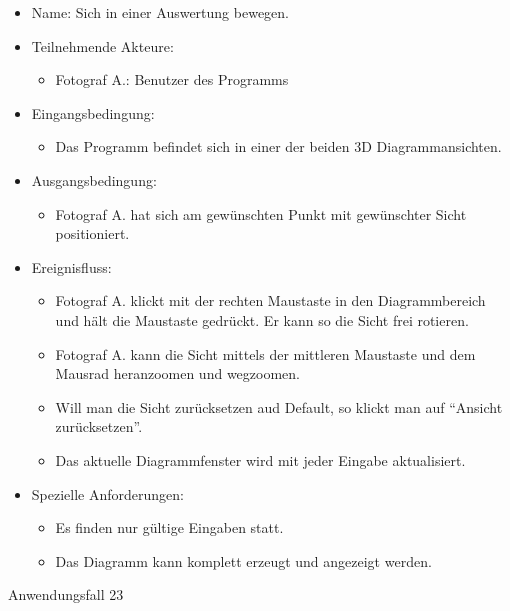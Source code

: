 \begin{itemize}
\item Name: Sich in einer Auswertung bewegen.
\item Teilnehmende Akteure:
\begin{itemize}
\item Fotograf A.: Benutzer des Programms
\end{itemize}
\item Eingangsbedingung:
\begin{itemize}
\item Das Programm befindet sich in einer der beiden 3D Diagrammansichten.
\end{itemize}
\item Ausgangsbedingung:
\begin{itemize}
\item Fotograf A. hat sich am gewünschten Punkt mit gewünschter Sicht positioniert.
\end{itemize}
\item Ereignisfluss:
\begin{itemize}
\item Fotograf A. klickt mit der rechten Maustaste in den Diagrammbereich und hält die Maustaste gedrückt. Er kann so die Sicht frei rotieren.
\item Fotograf A. kann die Sicht mittels der mittleren Maustaste und dem Mausrad heranzoomen und wegzoomen.
\item Will man die Sicht zurücksetzen aud Default, so klickt man auf "`Ansicht zurücksetzen"'.
\item Das aktuelle Diagrammfenster wird mit jeder Eingabe aktualisiert.
\end{itemize}
\item Spezielle Anforderungen:
\begin{itemize}
\item Es finden nur gültige Eingaben statt.
\item Das Diagramm kann komplett erzeugt und angezeigt werden.
\end{itemize}
\end{itemize}
 
\begin{description}
\item[Anwendungsfall 23]
\end{description}
 
